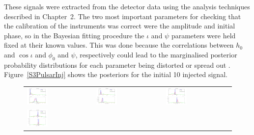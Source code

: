 These signals were extracted from the detector data using the analysis techniques described in
Chapter~2. The two most important parameters for checking that the calibration of the instruments
was correct were the amplitude and initial phase, so in the Bayesian fitting procedure the $\iota$
and $\psi$ parameters were held fixed at their known values. This was done because the correlations
between $h_0$ and $\cos{\iota}$ and $\phi_0$ and $\psi$, respectively could lead to the marginalised
posterior probability distributions for each parameter being distorted or spread out
\cite{Dupuis:2004}. Figure~\ref{S3PulsarInj} shows the posteriors for the initial 10 injected
signal.
\begin{figure}[!htbp]
\begin{tabular}{l l l}
\includegraphics[width=0.33\textwidth]{figs/S3PULSAR0} &
\includegraphics[width=0.33\textwidth]{figs/S3PULSAR1} &
\includegraphics[width=0.33\textwidth]{figs/S3PULSAR2} \\
\includegraphics[width=0.33\textwidth]{figs/S3PULSAR3} &

\end{tabular}
\end{figure}
